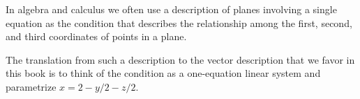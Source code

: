 In algebra and calculus we often use a description of planes involving 
a single equation
as the condition that describes 
the relationship among the first, second, and third
coordinates of points in a plane.
\newsavebox{\jhscratchbox}
\savebox{\jhscratchbox}{\texttt{[image: ch1.18]}}
\newlength{\jhscratchlength}\newlength{\jhscratchheight}
\settowidth{\jhscratchlength}{\usebox{\jhscratchbox}}
\begin{center}
  \usebox{\jhscratchbox}
\end{center}
The translation from such a description to the vector description that we
favor in this book is to 
think of the condition as a one-equation linear system
and parametrize \( x=2-y/2-z/2 \).
\begin{center}
  \makebox[\jhscratchlength][l]{\texttt{[image: ch1.20]}}
\end{center}

